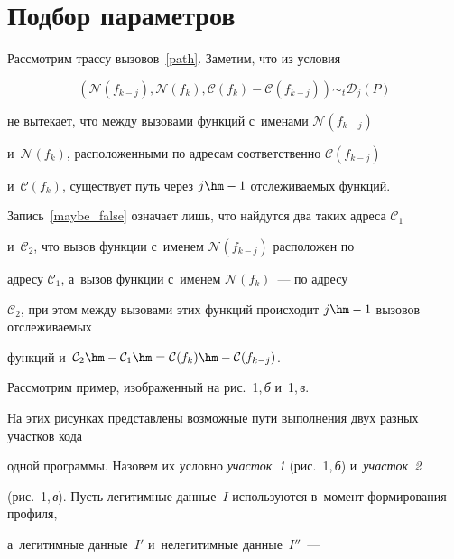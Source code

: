\section{Подбор параметров}







Рассмотрим трассу вызовов~\eqref{path}. Заметим, что из условия

\begin{equation}

\label{maybe_false}

\left(\mathcal{N}\left(f_{k-j}\right),\mathcal{N}\left(f_{k}\right), \mathcal{C}\left(f_{k}\right)-

\mathcal{C}\left(f_{k-j}\right) \right)\sim_t \mathcal{D}_{j}(P)

\end{equation}

не вытекает, что между вызовами функций с~именами $\mathcal{N}(f_{k-j})$ 

и~$\mathcal{N}(f_{k})$, расположенными по адресам соответственно $\mathcal{C}(f_{k-j})$ 

и~$\mathcal{C}(f_{k})$, существует путь через $j\hm-1$ от\-сле\-жи\-ва\-емых функций. 

Запись~\eqref{maybe_false} означает лишь, что найдутся два таких адреса $\mathcal{C}_1$ 

и~$\mathcal{C}_2$, что вызов функции с~именем $\mathcal{N}(f_{k-j})$ расположен по 

адресу $\mathcal{C}_1$, а~вызов функции с~именем $\mathcal{N}(f_{k})$~--- по адресу 

$\mathcal{C}_2$, при этом между вызовами этих функций происходит $j\hm-1$ вызовов отслеживаемых 

функций и~$\mathcal{C}_2\hm-\mathcal{C}_1\hm=\mathcal{C}(f_{k})\hm-\mathcal{C}(f_{k-j})$. 

Рассмотрим пример, изображенный на рис.~1,\,\textit{б} и~1,\,\textit{в}. 

На этих рисунках пред\-став\-ле\-ны возможные пути выполнения двух разных участков кода 

одной программы. Назовем их условно \textit{участок~1} (рис.~1,\,\textit{б}) и~\textit{участок~2} 

(рис.~1,\,\textit{в}). Пусть легитимные данные~$I$ используются в~момент формирования профиля, 

а~легитимные данные~$I'$ и~нелегитимные данные~$I''$~--- 

